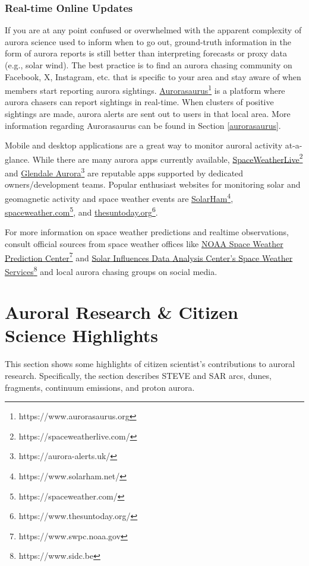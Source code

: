 \documentclass{article}
\renewcommand{\cite}[1]{\parencite{#1}}
\begin{document}
\subsubsection{Real-time Online Updates}
If you are at any point confused or overwhelmed with the apparent complexity of aurora science used to inform when to go out, ground-truth information in the form of aurora reports is still better than interpreting forecasts or proxy data (e.g., solar wind). The best practice is to find an aurora chasing community on Facebook, X, Instagram, etc. that is specific to your area and stay aware of when members start reporting aurora sightings. \href{https://www.aurorasaurus.org}{Aurorasaurus}\footnote{https://www.aurorasaurus.org} \cite{MacDonald2015} is a platform where aurora chasers can report sightings in real-time. When clusters of positive sightings are made, aurora alerts are sent out to users in that local area. More information regarding Aurorasaurus can be found in Section \ref{aurorasaurus}.

Mobile and desktop applications are a great way to monitor auroral activity at-a-glance. While there are many aurora apps currently available, \href{https://spaceweatherlive.com/}{SpaceWeatherLive}\footnote{https://spaceweatherlive.com/} and \href{https://aurora-alerts.uk/}{Glendale Aurora}\footnote{https://aurora-alerts.uk/} are reputable apps supported by dedicated owners/development teams. Popular enthusiast websites for monitoring solar and geomagnetic activity and space weather events are \href{https://www.solarham.net/}{SolarHam}\footnote{https://www.solarham.net/}, \href{https://spaceweather.com/}{spaceweather.com}\footnote{https://spaceweather.com/}, and \href{https://www.thesuntoday.org/}{thesuntoday.org}\footnote{https://www.thesuntoday.org/}.

For more information on space weather predictions and realtime observations, consult official sources from space weather offices like \href{https://www.swpc.noaa.gov}{NOAA Space Weather Prediction Center}\footnote{https://www.swpc.noaa.gov} and \href{https://www.sidc.be}{Solar Influences Data Analysis Center's Space Weather Services}\footnote{https://www.sidc.be} and local aurora chasing groups on social media.

\section{Auroral Research \& Citizen Science Highlights}
This section shows some highlights of citizen scientist's contributions to auroral research. Specifically, the section describes STEVE and SAR arcs, dunes, fragments, continuum emissions, and proton aurora.
\end{document}
